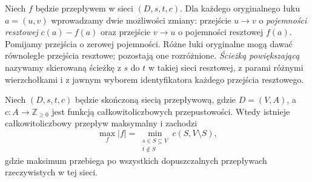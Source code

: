 \begin{definicja}
Niech $f$ będzie przepływem w sieci $(D,s,t,c)$.
Dla każdego oryginalnego łuku $a=(u,v)$
wprowadzamy dwie możliwości zmiany: przejście $u\to v$
o \emph{pojemności resztowej} $c(a)-f(a)$ oraz przejście
$v\to u$ o pojemności resztowej $f(a)$. Pomijamy
przejścia o zerowej pojemności. Różne łuki oryginalne
mogą dawać równoległe przejścia resztowe; pozostają one
rozróżnione. \emph{Ścieżką powiększającą} nazywamy
skierowaną ścieżkę z $s$ do $t$ w takiej sieci resztowej,
z parami różnymi wierzchołkami i z jawnym wyborem
identyfikatora każdego przejścia resztowego.
\end{definicja}

\begin{twierdzenie}
\label{thm:tg-maxflow}
Niech $(D,s,t,c)$ będzie skończoną siecią przepływową,
gdzie $D=(V,A)$, a $c:A\to\mathbb Z_{\ge0}$ jest funkcją
całkowitoliczbowych przepustowości. Wtedy istnieje
całkowitoliczbowy przepływ maksymalny i zachodzi
\[
\max_f |f|=\min_{\substack{s\in S\subseteq V\\t\notin S}}
 c(S,V\setminus S),
\]
gdzie maksimum przebiega po wszystkich dopuszczalnych
przepływach rzeczywistych w tej sieci.
\end{twierdzenie}

